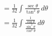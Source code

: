 \documentclass[preview]{standalone}
\begin{document}
\begin{align*}
&=\frac{1}{32} \int \frac{\sec\theta}{\tan^2\theta }\, d\theta \\&=\frac{1}{32} \int \frac{\frac{1}{\cos\theta}}{\frac{\sin^2\theta}{\cos^2\theta}} \, d\theta
\end{align*}
\end{document}
